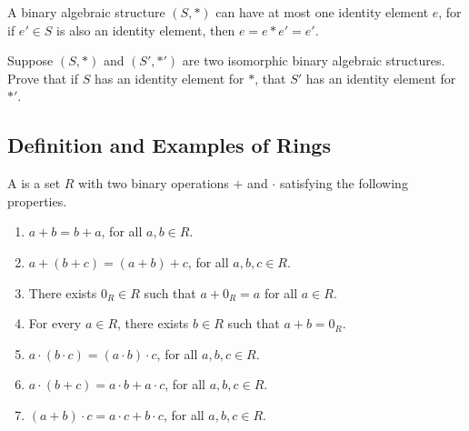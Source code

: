 \documentclass[11pt,fleqn,dvipsnames,usenames]{article}
\begin{document}
%
\begin{remark}\label{uniqueidentities}
A binary algebraic structure $(S,*)$ can have at most one identity element $e$, for if $e'\in S$ is also an identity element, then $e = e*e' = e'$.
\end{remark}
%
\begin{exercise}
Suppose $(S,*)$ and $(S',*')$ are two isomorphic binary algebraic structures.  Prove that if $S$ has an identity element for $*$, that $S'$ has an identity element for $*'$.
\end{exercise}

\subsection{Definition and Examples of Rings}

\begin{definition}\label{ringdefinition}
A  is a set $R$ with two binary operations $+$ and $\cdot$ satisfying the following properties.
\begin{enumerate}[(1)]
\item $a + b = b + a$, for all $a,b\in R$.
\item $a + (b + c) = (a + b) + c$, for all $a,b,c\in R$.
\item There exists $0_{R}\in R$ such that $a + 0_{R} = a$ for all $a\in R$.\label{additiveidentity}
\item For every $a\in R$, there exists $b\in R$ such that $a + b = 0_{R}$.\label{additiveinverse}
\item $a\cdot(b\cdot c) = (a\cdot b)\cdot c$, for all $a,b,c\in R$.
\item $a\cdot(b + c) = a\cdot b + a\cdot c$, for all $a,b,c\in R$.
\item $(a + b)\cdot c = a\cdot c + b\cdot c$, for all $a,b,c\in R$.\label{rightdistributivity}
\end{enumerate}
\end{definition}
%
\end{document}
